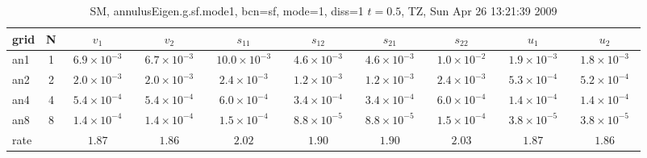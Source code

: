 \begin{table}[hbt]\tableFont %
\begin{center}
\begin{tabular}{|l|c|c|c|c|c|c|c|c|c|} \hline\hline 
grid  & N  & $v_1$ & $v_2$ & $s_{11}$ & $s_{12}$ & $s_{21}$ & $s_{22}$ &  $u_1$ & $u_2$\\ \hline 
                 an1 &     1 & ~$6.9\times10^{ -3}$~ & ~$6.7\times10^{ -3}$~ & ~$10.0\times10^{ -3}$~ & ~$4.6\times10^{ -3}$~ & ~$4.6\times10^{ -3}$~ & ~$1.0\times10^{ -2}$~ & ~$1.9\times10^{ -3}$~ & ~$1.8\times10^{ -3}$~  \\ \hline
                 an2 &     2 & ~$2.0\times10^{ -3}$~ & ~$2.0\times10^{ -3}$~ & ~$2.4\times10^{ -3}$~ & ~$1.2\times10^{ -3}$~ & ~$1.2\times10^{ -3}$~ & ~$2.4\times10^{ -3}$~ & ~$5.3\times10^{ -4}$~ & ~$5.2\times10^{ -4}$~  \\ \hline
                 an4 &     4 & ~$5.4\times10^{ -4}$~ & ~$5.4\times10^{ -4}$~ & ~$6.0\times10^{ -4}$~ & ~$3.4\times10^{ -4}$~ & ~$3.4\times10^{ -4}$~ & ~$6.0\times10^{ -4}$~ & ~$1.4\times10^{ -4}$~ & ~$1.4\times10^{ -4}$~  \\ \hline
                 an8 &     8 & ~$1.4\times10^{ -4}$~ & ~$1.4\times10^{ -4}$~ & ~$1.5\times10^{ -4}$~ & ~$8.8\times10^{ -5}$~ & ~$8.8\times10^{ -5}$~ & ~$1.5\times10^{ -4}$~ & ~$3.8\times10^{ -5}$~ & ~$3.8\times10^{ -5}$~  \\ \hline
    rate             &       &       $1.87$          &       $1.86$          &       $2.02$          &       $1.90$          &       $1.90$          &       $2.03$          &       $1.87$          &       $1.86$           \\ \hline\hline
\end{tabular}
\caption{SM, annulusEigen.g.sf.mode1, bcn=sf, mode=1, diss=1 $t=0.5$,  TZ, Sun Apr 26 13:21:39 2009}\label{table:annulusEigen.g.sf.mode1}
\end{center}
\end{table}
